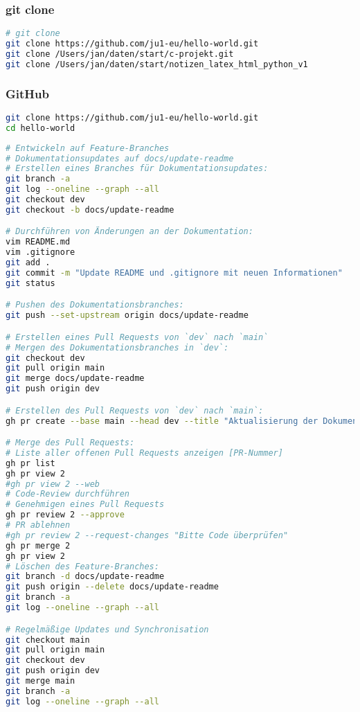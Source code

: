 \documentclass{vorlage-design-main}
\begin{document}
\hypertarget{git-clone}{%
\subsubsection{git clone}\label{git-clone}}

\begin{lstlisting}[language=bash]
# git clone
git clone https://github.com/ju1-eu/hello-world.git
git clone /Users/jan/daten/start/c-projekt.git
git clone /Users/jan/daten/start/notizen_latex_html_python_v1
\end{lstlisting}

\hypertarget{github}{%
\subsubsection{GitHub}\label{github}}

\begin{lstlisting}[language=bash]
git clone https://github.com/ju1-eu/hello-world.git
cd hello-world
\end{lstlisting}

\begin{lstlisting}[language=bash]
# Entwickeln auf Feature-Branches
# Dokumentationsupdates auf docs/update-readme
# Erstellen eines Branches für Dokumentationsupdates:
git branch -a
git log --oneline --graph --all
git checkout dev
git checkout -b docs/update-readme

# Durchführen von Änderungen an der Dokumentation:
vim README.md
vim .gitignore
git add .
git commit -m "Update README und .gitignore mit neuen Informationen"
git status

# Pushen des Dokumentationsbranches:
git push --set-upstream origin docs/update-readme

# Erstellen eines Pull Requests von `dev` nach `main`
# Mergen des Dokumentationsbranches in `dev`:
git checkout dev
git pull origin main
git merge docs/update-readme
git push origin dev

# Erstellen des Pull Requests von `dev` nach `main`:
gh pr create --base main --head dev --title "Aktualisierung der Dokumentation" --body "Fügt detaillierte Informationen zur README hinzu."

# Merge des Pull Requests:
# Liste aller offenen Pull Requests anzeigen [PR-Nummer]
gh pr list
gh pr view 2
#gh pr view 2 --web
# Code-Review durchführen
# Genehmigen eines Pull Requests
gh pr review 2 --approve
# PR ablehnen
#gh pr review 2 --request-changes "Bitte Code überprüfen"
gh pr merge 2
gh pr view 2
# Löschen des Feature-Branches:
git branch -d docs/update-readme
git push origin --delete docs/update-readme
git branch -a
git log --oneline --graph --all

# Regelmäßige Updates und Synchronisation
git checkout main
git pull origin main
git checkout dev
git push origin dev
git merge main
git branch -a
git log --oneline --graph --all
\end{lstlisting}
\end{document}
